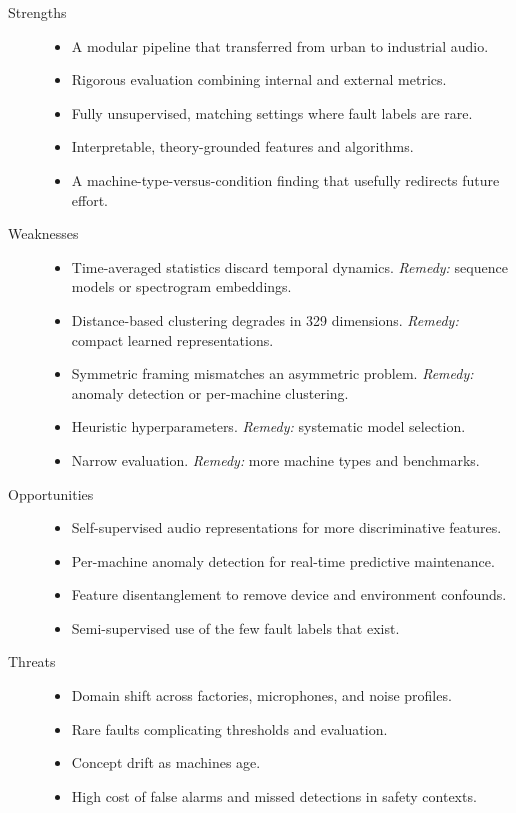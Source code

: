 \documentclass[runningheads,a4paper,11pt]{report}
\begin{document}
\begin{description}
    \item[Strengths] \hfill
    \begin{itemize}
        \item A modular pipeline that transferred from urban to industrial audio.
        \item Rigorous evaluation combining internal and external metrics.
        \item Fully unsupervised, matching settings where fault labels are rare.
        \item Interpretable, theory-grounded features and algorithms.
        \item A machine-type-versus-condition finding that usefully redirects future effort.
    \end{itemize}

    \item[Weaknesses] \hfill
    \begin{itemize}
        \item Time-averaged statistics discard temporal dynamics. \emph{Remedy:} sequence models or spectrogram embeddings.
        \item Distance-based clustering degrades in 329 dimensions. \emph{Remedy:} compact learned representations.
        \item Symmetric framing mismatches an asymmetric problem. \emph{Remedy:} anomaly detection or per-machine clustering.
        \item Heuristic hyperparameters. \emph{Remedy:} systematic model selection.
        \item Narrow evaluation. \emph{Remedy:} more machine types and benchmarks.
    \end{itemize}

    \item[Opportunities] \hfill
    \begin{itemize}
        \item Self-supervised audio representations for more discriminative features.
        \item Per-machine anomaly detection for real-time predictive maintenance.
        \item Feature disentanglement to remove device and environment confounds.
        \item Semi-supervised use of the few fault labels that exist.
    \end{itemize}

    \item[Threats] \hfill
    \begin{itemize}
        \item Domain shift across factories, microphones, and noise profiles.
        \item Rare faults complicating thresholds and evaluation.
        \item Concept drift as machines age.
        \item High cost of false alarms and missed detections in safety contexts.
    \end{itemize}
\end{description}
\end{document}
